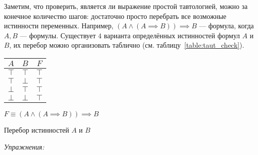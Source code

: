 Заметим, что проверить, является ли выражение простой тавтологией,
можно за конечное количество шагов: достаточно просто перебрать все возможные истинности
переменных.
Например, ${(A\land (A\implies B))\implies B}$ --- формула, когда $A,B$ --- формулы.
Существует $4$ варианта определённых истинностей формул $A$ и $B$,
их перебор можно организовать таблично (см. таблицу~\ref{table:taut_check}).
\begin{margintable}
	\begin{tabular}{cc|c}
		$A$    & $B$    & $F$    \\\hline
		$\top$ & $\top$ & $\top$ \\
		$\top$ & $\bot$ & $\top$ \\
		$\bot$ & $\top$ & $\top$ \\
		$\bot$ & $\bot$ & $\top$
	\end{tabular}

	\vspace{0.5em}
	$F\equiv{(A\land (A\implies B))\implies B}$

	\caption{Перебор истинностей $A$ и $B$}\label{table:taut_check}
\end{margintable}

\vspace{1em}
{\it Упражнения:}


